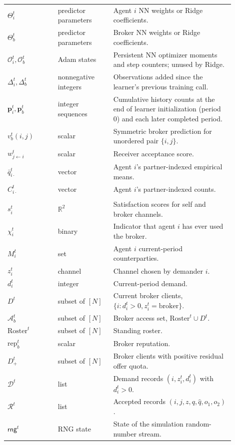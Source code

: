 \documentclass[11pt]{article}
\newcommand{\R}{\mathbb{R}}
\newcommand{\Ab}{\mathcal A_b}
\begin{document}
\begin{longtable}{>{\raggedright\arraybackslash}p{0.20\linewidth}
                >{\raggedright\arraybackslash}p{0.22\linewidth}
                >{\raggedright\arraybackslash}p{0.48\linewidth}}
$\Theta_i^t$ & predictor parameters & Agent $i$ NN weights or Ridge coefficients. \\
$\Theta_b^t$ & predictor parameters & Broker NN weights or Ridge coefficients. \\
$\mathcal O_i^t,\mathcal O_b^t$ & Adam states & Persistent NN optimizer moments and step counters; unused by Ridge. \\
$\Delta_i^t,\Delta_b^t$ & nonnegative integers & Observations added since the learner's previous training call. \\
$\mathbf p_i^t,\mathbf p_b^t$ & integer sequences & Cumulative history counts at the end of learner initialization (period 0) and each later completed period. \\
$v_b^t(i,j)$ & scalar & Symmetric broker prediction for unordered pair $\{i,j\}$. \\
$w_{j\leftarrow i}^t$ & scalar & Receiver acceptance score. \\
$\bar q_{i\cdot}^t$ & vector & Agent $i$'s partner-indexed empirical means. \\
$C_{i\cdot}^t$ & vector & Agent $i$'s partner-indexed counts. \\
\addlinespace[0.25em]
\multicolumn{3}{@{}l}{\textit{Period state and market objects}}\\
$s_i^t$ & $\R^2$ & Satisfaction scores for self and broker channels. \\
$\chi_i^t$ & binary & Indicator that agent $i$ has ever used the broker. \\
$M_i^t$ & set & Agent $i$ current-period counterparties. \\
$z_i^t$ & channel & Channel chosen by demander $i$. \\
$d_i^t$ & integer & Current-period demand. \\
$D^t$ & subset of $[N]$ & Current broker clients, $\{i:d_i^t>0,z_i^t=\mathrm{broker}\}$. \\
$\Ab^t$ & subset of $[N]$ & Broker access set, $\mathrm{Roster}^t\cup D^t$. \\
$\mathrm{Roster}^t$ & subset of $[N]$ & Standing roster. \\
$\mathrm{rep}_b^t$ & scalar & Broker reputation. \\
$D_+^t$ & subset of $[N]$ & Broker clients with positive residual offer quota. \\
$\mathcal D^t$ & list & Demand records $(i,z_i^t,d_i^t)$ with $d_i^t>0$. \\
$\mathcal R^t$ & list & Accepted records $(i,j,z,q,\hat q,o_1,o_2)$. \\
$\mathsf{rng}^t$ & RNG state & State of the simulation random-number stream. \\
\bottomrule
\end{longtable}
\endgroup
\end{document}
